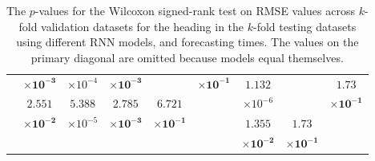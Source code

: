 \begin{table}[!ht]
{\begin{tabular}{|c|c|c|c|c|c|c|c|c|c|}
			 \multicolumn{2}{c}{} & $\mathbf{\times 10^{-3}}$ & $\times 10^{-4}$ & $\mathbf{\times 10^{-3}}$ & & $\mathbf{\times 10^{-1}}$ & $1.132$ & \multirow{2}{*}{} & $\mathbf{1.73}$\\ \cline{3-7}
			 \multicolumn{2}{c}{} & $\mathbf{2.551}$ & $5.388$ & $\mathbf{2.785}$ & $\mathbf{6.721}$ & \multirow{2}{*}{} & $\times 10^{-6}$ & & $\mathbf{\times 10^{-1}}$\\ \cline{8-10}
			 \multicolumn{2}{c}{} & $\mathbf{\times 10^{-2}}$ & $\times 10^{-5}$ & $\mathbf{\times 10^{-3}}$ & $\mathbf{\times 10^{-1}}$ & & $\mathbf{1.355}$ & $\mathbf{1.73}$ & \multirow{2}{*}{} \\ \cline{3-7}
			 \multicolumn{7}{c}{} & $\mathbf{\times 10^{-2}}$ & $\mathbf{\times 10^{-1}}$ & \\ \cline{2-2} \cline{4-10}
		\end{tabular}
	}
	\caption{The $p$-values for the Wilcoxon signed-rank test on RMSE values across $k$-fold validation datasets for the heading in the $k$-fold testing datasets using different RNN models, and forecasting times. The values on the primary diagonal are omitted because models equal themselves.}
	\label{tab:var_direction_RMSE}
\end{table}